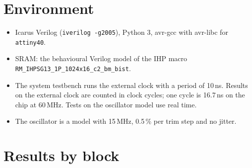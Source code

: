 \documentclass[10pt,a4paper]{article}
\begin{document}
\section{Environment}

\begin{itemize}
\item Icarus Verilog (\texttt{iverilog -g2005}), Python 3, avr-gcc with avr-libc for \texttt{attiny40}.
\item SRAM: the behavioural Verilog model of the IHP macro \texttt{RM\_IHPSG13\_1P\_1024x16\_c2\_bm\_bist}.
\item The system testbench runs the external clock with a period of 10\,ns. Results on the external clock are
counted in clock cycles; one cycle is 16.7\,ns on the chip at 60\,MHz. Tests on the oscillator model use real
time.
\item The oscillator is a model with 15\,MHz, 0.5\,\% per trim step and no jitter.
\end{itemize}

\section{Results by block}
\end{document}
